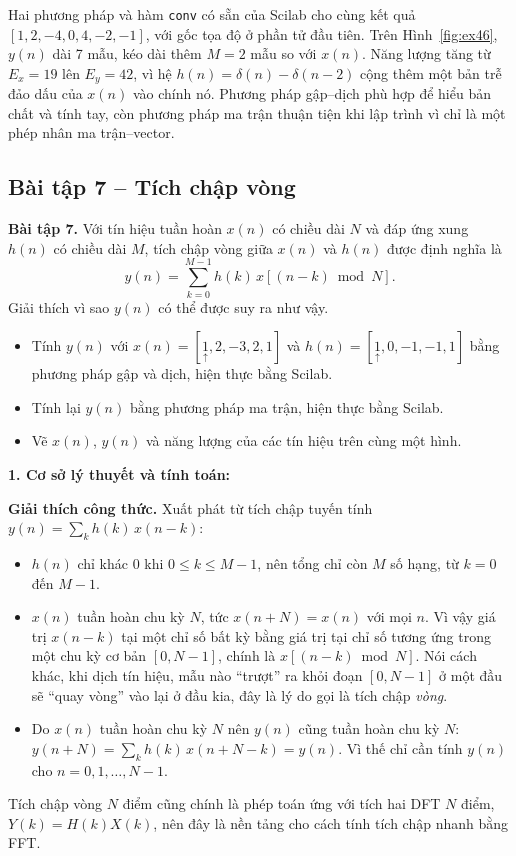 \documentclass[12pt,a4paper]{article}
\newcommand{\org}[1]{\underset{\uparrow}{#1}}
\begin{document}
Hai phương pháp và hàm \texttt{conv} có sẵn của Scilab cho cùng kết quả $[1, 2, -4, 0, 4, -2, -1]$, với gốc tọa độ ở phần tử đầu tiên. Trên Hình~\ref{fig:ex46}, $y(n)$ dài 7 mẫu, kéo dài thêm $M = 2$ mẫu so với $x(n)$. Năng lượng tăng từ $E_x = 19$ lên $E_y = 42$, vì hệ $h(n) = \delta(n) - \delta(n-2)$ cộng thêm một bản trễ đảo dấu của $x(n)$ vào chính nó. Phương pháp gập--dịch phù hợp để hiểu bản chất và tính tay, còn phương pháp ma trận thuận tiện khi lập trình vì chỉ là một phép nhân ma trận--vector.

\subsection{Bài tập 7 -- Tích chập vòng}
\begin{mdframed}[style=exbox]
\noindent\textbf{Bài tập 7.} Với tín hiệu tuần hoàn $x(n)$ có chiều dài $N$ và đáp ứng xung $h(n)$ có chiều dài $M$, tích chập vòng giữa $x(n)$ và $h(n)$ được định nghĩa là
\[
    y(n) = \sum_{k=0}^{M-1} h(k)\, x[(n-k) \bmod N].
\]
Giải thích vì sao $y(n)$ có thể được suy ra như vậy.
\begin{itemize}
    \item Tính $y(n)$ với $x(n) = [\org{1}, 2, -3, 2, 1]$ và $h(n) = [\org{1}, 0, -1, -1, 1]$ bằng phương pháp gập và dịch, hiện thực bằng Scilab.
    \item Tính lại $y(n)$ bằng phương pháp ma trận, hiện thực bằng Scilab.
    \item Vẽ $x(n)$, $y(n)$ và năng lượng của các tín hiệu trên cùng một hình.
\end{itemize}
\end{mdframed}

\noindent\textbf{1. Cơ sở lý thuyết và tính toán:}

\textbf{Giải thích công thức.} Xuất phát từ tích chập tuyến tính $y(n) = \sum_{k} h(k)\, x(n-k)$:
\begin{itemize}
    \item $h(n)$ chỉ khác 0 khi $0 \le k \le M-1$, nên tổng chỉ còn $M$ số hạng, từ $k = 0$ đến $M - 1$.
    \item $x(n)$ tuần hoàn chu kỳ $N$, tức $x(n + N) = x(n)$ với mọi $n$. Vì vậy giá trị $x(n-k)$ tại một chỉ số bất kỳ bằng giá trị tại chỉ số tương ứng trong một chu kỳ cơ bản $[0, N-1]$, chính là $x[(n-k) \bmod N]$. Nói cách khác, khi dịch tín hiệu, mẫu nào ``trượt'' ra khỏi đoạn $[0, N-1]$ ở một đầu sẽ ``quay vòng'' vào lại ở đầu kia, đây là lý do gọi là tích chập \emph{vòng}.
    \item Do $x(n)$ tuần hoàn chu kỳ $N$ nên $y(n)$ cũng tuần hoàn chu kỳ $N$: $y(n+N) = \sum_k h(k)\, x(n + N - k) = y(n)$. Vì thế chỉ cần tính $y(n)$ cho $n = 0, 1, \dots, N-1$.
\end{itemize}
Tích chập vòng $N$ điểm cũng chính là phép toán ứng với tích hai DFT $N$ điểm, $Y(k) = H(k)X(k)$, nên đây là nền tảng cho cách tính tích chập nhanh bằng FFT.
\end{document}
